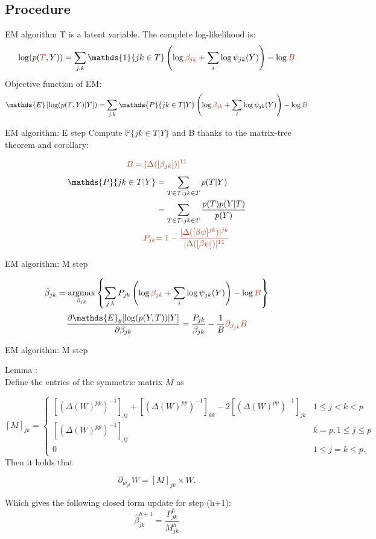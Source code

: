 \documentclass[11pt]{beamer}
\newcommand{\emphase}[1]{\textcolor{Complement}{#1}}
\newcommand{\argmax}{\mathop{\mathrm{argmax}}}
\begin{document}
\subsection{Procedure}
\begin{frame}{EM algorithm}
T is a latent variable. The complete log-likelihood is:
$$ \log(p(\emphase{T},Y)) = \sum_{j,k} \mathds{1}\{jk \in T\} \left( \log \emphase{\beta_{jk}} + \sum_i \log \psi_{jk}(Y)\right) - \log \emphase{B}$$
Objective function of EM:
$$\mathds{E}\left[\log(p(\emphase{T},Y)|Y\right]) = \sum_{j,k} \mathds{P}\{jk\in T |Y\}\left( \log \emphase{\beta_{jk}} + \sum_i \log \psi_{jk}(Y)\right) - \log \emphase{B}$$
\end{frame}
\begin{frame}{EM algorithm: E step}
Compute $\mathds{P}\{jk\in T |Y\}$ and B thanks to the matrix-tree theorem and corollary:

$$\emphase{B = |\Delta([\beta_{jk}])|^{11}}$$
\begin{align*}
\mathds{P}\{jk\in T |Y\} &= \sum_{T\in \mathcal{T}: jk\in T} p(T|Y)\\
&=\sum_{T\in \mathcal{T}: jk\in T} \frac{p(T)p(Y|T)}{p(Y)}\\
\emphase{P_{jk}}&\emphase{=1-\frac{|\Delta([\beta\psi]^{jk})|^{jk}}{|\Delta([\beta\psi])|^{11}}}
\end{align*}

\end{frame}
 \begin{frame}{EM algorithm: M step}

\[\hat{\beta}_{jk} = \argmax_{\beta_{jk}} \left\{\sum_{j,k} P_{jk}\left( \log \emphase{\beta_{jk}} + \sum_i \log \psi_{jk}(Y)\right) - \log \emphase{B}\right\}\]
\bigskip\bigskip
\[ \frac{\partial\mathds{E}_\theta[\log(p(Y,T))|Y]}{\partial\beta_{jk}} =\frac{ P_{jk} }{\beta_{jk}} - \frac{1}{B}
\emphase{\partial_{\beta_{jk}} B}
\]
 
\end{frame}

 \begin{frame}{EM algorithm: M step}

\emphase{Lemma}  \citep{MeilaJaak}:\\
\footnotesize
    Define the entries of the symmetric matrix $M$ as

\[    
 [M]_{jk}=\begin{cases}
    \left[(\Delta(W)^{pp})^{-1}\right]_{jj} + \left[(\Delta(W)^{pp})^{-1}\right]_{kk}    		-2\left[(\Delta(W)^{pp})^{-1}\right]_{jk} & 1\leq j<k < p\\
    \left[(\Delta(W)^{pp})^{-1}\right]_{jj} & k=p, 1\leq j \leq p  \\
    0 & 1\leq j=k \leq p.
    \end{cases}
\]
\normalsize
Then it holds that

$$
\partial_{w_{jk}} W = [M]_{jk} \times W.
$$

\bigskip\bigskip

Which gives the following closed form update for step (h+1):
\emphase{
   \large{\[\hat{\beta}_{jk}^{h+1} = \frac{P_{jk}^h}{M_{jk}^h}\]}
}
 \end{frame}
\end{document}
